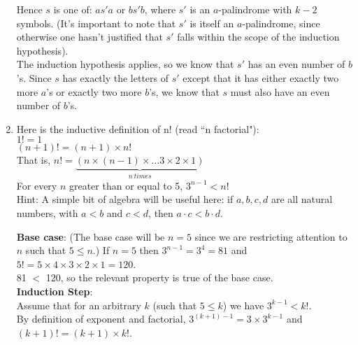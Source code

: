 \documentclass[12pt]{article}
\begin{document}
\begin{enumerate}
Hence
$s$ is one of: $as' a$ or $bs' b$, where $s'$ is an $a$-palindrome with 
$k-2$ symbols. (It's important to note that $s'$ is itself an $a$-palindrome, since otherwise one hasn't justified that $s'$ falls within the scope of the induction hypothesis).\\

The induction hypothesis applies, so we know that $s'$ has an even number of $b$'s. Since $s$ has exactly the letters of $s'$ except that it has either exactly two more $a$'s 
or exactly two more $b$'s, we know that $s$ must also have an even number
of $b$'s.\\ 


\newpage

\item Here is the inductive definition of n! (read ``n factorial"):\\
\noindent $1! = 1$\\
\noindent $(n+1)! = (n + 1) \times n!$\\

\noindent That is, $n! = \underbrace{(n \times (n-1) \times \ldots 3 \times 2 \times 1)}_{n \ times}$\\

 For every $n$ greater than or equal to 5, $3^{n-1} < n!$ \\%

Hint: A simple bit of algebra will be useful here: if $a, b, c, d$ are all natural numbers, with $a < b$ and $c < d$,
then $a\cdot c < b\cdot d$.
  

{\bf{Base case}}: (The base case will be $n = 5$ since we are restricting attention to $n$ such that $5 \leq n$.)
If $n = 5$ then $3^{n-1} = 3^4 = 81$ and $5! = 5\times 4\times 3\times 2\times 1 = 120$.\\

81 $<$ 120, 
so the relevant property is true of the base case.\\

{\bf{Induction Step}}: \\
Assume that for an arbitrary $k$ (such that $5 \leq k$) we have $3^{k-1} < k!$.\\ %

By definition of exponent and factorial, $3^{(k+1) -1} = 3\times3^{k-1}$ and $ (k+1)! = (k+1)\times k!$.\\


\end{enumerate}
\end{document}
